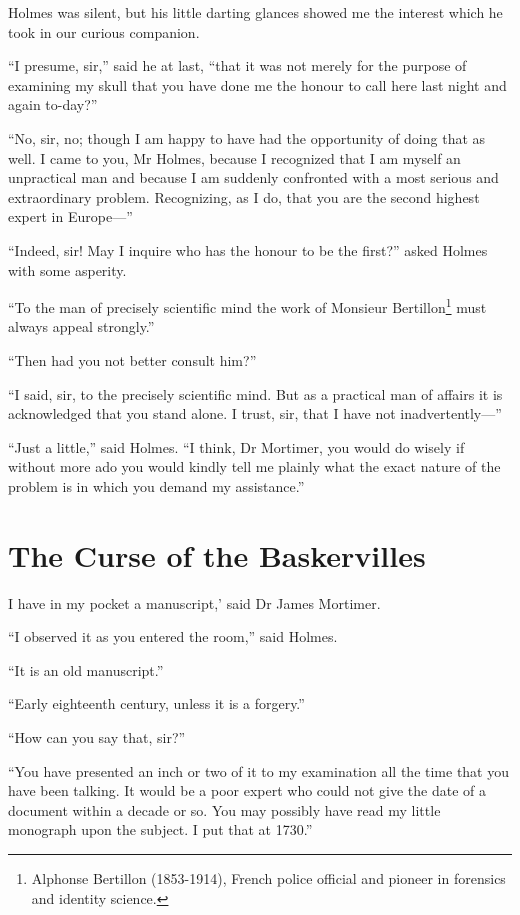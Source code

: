 \documentclass[paper=a5,BCOR=7mm,twoside,DIV=calc,12pt,usegeometry,openany,chapterprefix,endperiod,headings=big]{scrbook} %
\begin{document}
Holmes was silent, but his little darting glances showed me the interest which he took in our curious companion.

\enquote{I presume, sir,} said he at last, \enquote{that it was not merely for the purpose of examining my skull that you have done me the honour to call here last night and again to-day?}

\enquote{No, sir, no; though I am happy to have had the opportunity of doing that as well. I came to you, Mr Holmes, because I recognized that I am myself an unpractical man and because I am suddenly confronted with a most serious and extraordinary problem. Recognizing, as I do, that you are the second highest expert in Europe---}

\enquote{Indeed, sir! May I inquire who has the honour to be the first?} asked Holmes with some asperity.

\enquote{To the man of precisely scientific mind the work of Monsieur Bertillon\footnote{Alphonse Bertillon (1853-1914), French police official and pioneer in forensics and identity science.} must always appeal strongly.}

\enquote{Then had you not better consult him?}

\enquote{I said, sir, to the precisely scientific mind. But as a practical man of affairs it is acknowledged that you stand alone. I trust, sir, that I have not inadvertently---}

\enquote{Just a little,} said Holmes. \enquote{I think, Dr Mortimer, you would do wisely if without more ado you would kindly tell me plainly what the exact nature of the problem is in which you demand my assistance.}

\chapter{The Curse of the Baskervilles}
\lettrine[ante=`,lines=1]{I}{} have in my pocket a manuscript,' said Dr James Mortimer.

\enquote{I observed it as you entered the room,} said Holmes.

\enquote{It is an old manuscript.}

\enquote{Early eighteenth century, unless it is a forgery.}

\enquote{How can you say that, sir?}

\enquote{You have presented an inch or two of it to my examination all the time that you have been talking. It would be a poor expert who could not give the date of a document within a decade or so. You may possibly have read my little monograph upon the subject. I put that at 1730.}
\end{document}

